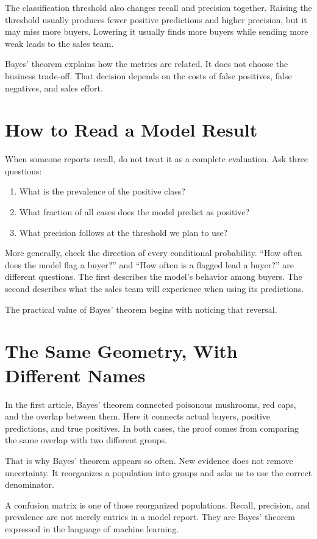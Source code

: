 \documentclass[11pt]{article}
\begin{document}
The classification threshold also changes recall and precision together. Raising the threshold usually produces fewer positive predictions and higher precision, but it may miss more buyers. Lowering it usually finds more buyers while sending more weak leads to the sales team.

Bayes' theorem explains how the metrics are related. It does not choose the business trade-off. That decision depends on the costs of false positives, false negatives, and sales effort.

\section*{How to Read a Model Result}

When someone reports recall, do not treat it as a complete evaluation. Ask three questions:

\begin{enumerate}
  \item What is the prevalence of the positive class?
  \item What fraction of all cases does the model predict as positive?
  \item What precision follows at the threshold we plan to use?
\end{enumerate}

More generally, check the direction of every conditional probability. ``How often does the model flag a buyer?'' and ``How often is a flagged lead a buyer?'' are different questions. The first describes the model's behavior among buyers. The second describes what the sales team will experience when using its predictions.

The practical value of Bayes' theorem begins with noticing that reversal.

\section*{The Same Geometry, With Different Names}

In the first article, Bayes' theorem connected poisonous mushrooms, red caps, and the overlap between them. Here it connects actual buyers, positive predictions, and true positives. In both cases, the proof comes from comparing the same overlap with two different groups.

That is why Bayes' theorem appears so often. New evidence does not remove uncertainty. It reorganizes a population into groups and asks us to use the correct denominator.

A confusion matrix is one of those reorganized populations. Recall, precision, and prevalence are not merely entries in a model report. They are Bayes' theorem expressed in the language of machine learning.
\end{document}
